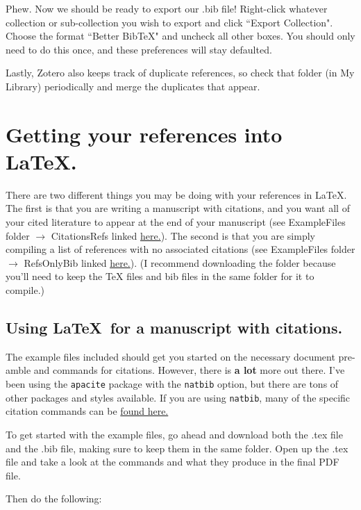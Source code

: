 \documentclass[11pt]{article}
\begin{document}
Phew. Now we should be ready to export our .bib file! Right-click whatever collection or sub-collection you wish to export and click ``Export Collection". Choose the format ``Better BibTeX" and uncheck all other boxes. You should only need to do this once, and these preferences will stay defaulted. 

Lastly, Zotero also keeps track of duplicate references, so check that folder (in My Library) periodically and merge the duplicates that appear.

\section{Getting your references into \LaTeX.}

There are two different things you may be doing with your references in \LaTeX. The first is that you are writing a manuscript with citations, and you want all of your cited literature to appear at the end of your manuscript (see ExampleFiles folder $\rightarrow$ CitationsRefs linked \href{https://github.com/ledelaney/BibTeXforBrownLab/tree/master/ExampleFiles/CitationsRefs}{here.}). The second is that you are simply compiling a list of references with no associated citations (see ExampleFiles folder $\rightarrow$ RefsOnlyBib linked \href{https://github.com/ledelaney/BibTeXforBrownLab/tree/master/ExampleFiles/RefsOnlyBib}{here.}). (I recommend downloading the folder because you'll need to keep the TeX files and bib files in the same folder for it to compile.)

\subsection{Using \LaTeX\ for a manuscript with citations.}
The example files included should get you started on the necessary document pre-amble and commands for citations. However, there is \textbf{a lot} more out there. I've been using the \verb|apacite| package with the \verb|natbib| option, but there are tons of other packages and styles available. If you are using \verb|natbib|, many of the specific citation commands can be \href{https://gking.harvard.edu/files/natbib2.pdf}{found here.}

To get started with the example files, go ahead and download both the .tex file and the .bib file, making sure to keep them in the same folder. Open up the .tex file and take a look at the commands and what they produce in the final PDF file.

\pagebreak
Then do the following:
\end{document}
